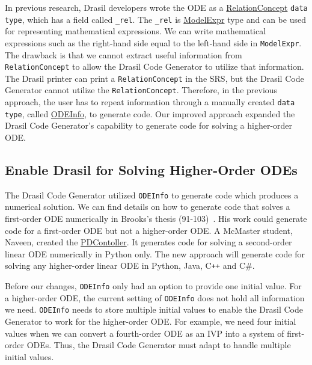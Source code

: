 In previous research, Drasil developers wrote the ODE as a \href{https://jacquescarette.github.io/Drasil/docs/full/drasil-lang-0.1.60.0/Language-Drasil-Chunk-Relation.html#t:RelationConcept}{RelationConcept} \verb|data type|, which has a field called \verb|_rel|. The \verb|_rel| is \href{https://jacquescarette.github.io/Drasil/docs/full/drasil-lang-0.1.60.0/Language-Drasil-ModelExpr-Lang.html#t:ModelExpr}{ModelExpr} type and can be used for representing mathematical expressions. We can write mathematical expressions such as the right-hand side equal to the left-hand side in \verb|ModelExpr|. The drawback is that we cannot extract useful information from \verb|RelationConcept| to allow the Drasil Code Generator to utilize that information. The Drasil printer can print a \verb|RelationConcept| in the SRS, but the Drasil Code Generator cannot utilize the \verb|RelationConcept|. Therefore, in the previous approach, the user has to repeat information through a manually created \verb|data type|, called \href{https://jacquescarette.github.io/Drasil/docs/drasil-code-0.1.9.0/Language-Drasil-Code.html#t:ODEInfo}{ODEInfo}, to generate code. Our improved approach expanded the Drasil Code Generator's capability to generate code for solving a higher-order ODE.

\subsection{Enable Drasil for Solving Higher-Order ODEs}
The Drasil Code Generator utilized \verb|ODEInfo| to generate code which produces a numerical solution. We can find details on how to generate code that solves a first-order ODE numerically in Brooks's thesis (91-103)~\citep{brooks}. His work could generate code for a first-order ODE but not a higher-order ODE. A McMaster student, Naveen, created the \href{https://jacquescarette.github.io/Drasil/examples/pdcontroller/SRS/srs/PDController_SRS.html}{PDContoller}. It generates code for solving a second-order linear ODE numerically in Python only. The new approach will generate code for solving any higher-order linear ODE in Python, Java, C\texttt{++} and C\#.

Before our changes, \verb|ODEInfo| only had an option to provide one initial value. For a higher-order ODE, the current setting of \verb|ODEInfo| does not hold all information we need. \verb|ODEInfo| needs to store multiple initial values to enable the Drasil Code Generator to work for the higher-order ODE. For example, we need four initial values when we can convert a fourth-order ODE as an IVP into a system of first-order ODEs. Thus, the Drasil Code Generator must adapt to handle multiple initial values.

